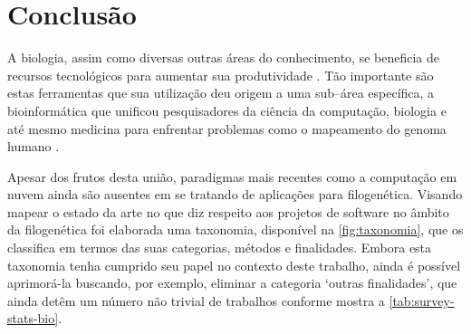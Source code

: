 \documentclass[english,brazilian]{UNISINOSmonografia} %
\begin{document}







\chapter{Conclusão}
\label{ch:conclusao}




A biologia, assim como diversas outras áreas do conhecimento, se beneficia de recursos tecnológicos para aumentar sua produtividade \cite{Denning2009}.
Tão importante são estas ferramentas que sua utilização deu origem a uma sub--área específica, a bioinformática que unificou pesquisadores da ciência da computação, biologia e até mesmo medicina para enfrentar problemas como o mapeamento do genoma humano \cite{Venter2001}.


Apesar dos frutos desta união, paradigmas mais recentes como a computação em nuvem ainda são ausentes em se tratando de aplicações para filogenética.
Visando mapear o estado da arte no que diz respeito aos projetos de software no âmbito da filogenética foi elaborada uma taxonomia, disponível na \autoref{fig:taxonomia}, que os classifica em termos das suas categorias, métodos e finalidades.
Embora esta taxonomia tenha cumprido seu papel no contexto deste trabalho, ainda é possível aprimorá-la buscando, por exemplo, eliminar a categoria \textquoteleft outras finalidades\textquoteright, que ainda detêm um número não trivial de trabalhos conforme mostra a \autoref{tab:survey-stats-bio}.
\end{document}
